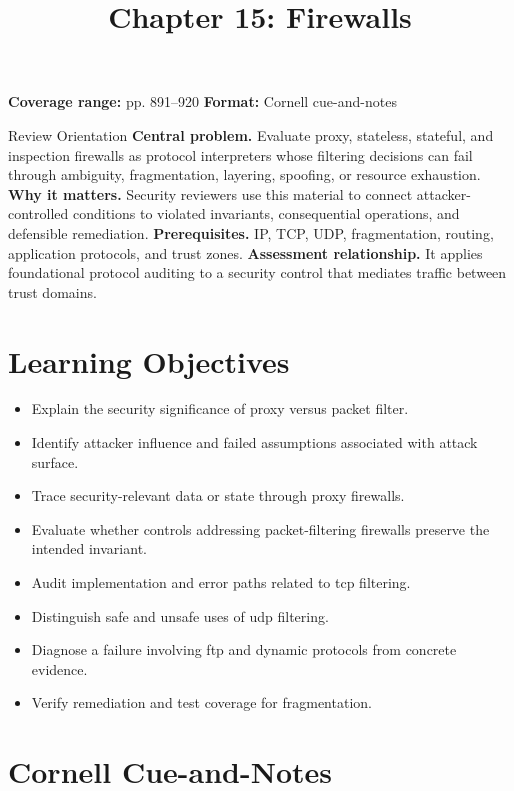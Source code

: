 \documentclass[11pt,letterpaper]{article}
\title{Chapter 15: Firewalls}
\author{}
\date{}
\begin{document}
\maketitle

\begin{center}
\small\color{Meta}\textbf{Coverage range:} pp. 891--920 \quad\textbullet\quad \textbf{Format:} Cornell cue-and-notes
\end{center}
\vspace{0.25em}
\begin{CornellOverviewBox}{Review Orientation}
\textbf{Central problem.} Evaluate proxy, stateless, stateful, and inspection firewalls as protocol interpreters whose filtering decisions can fail through ambiguity, fragmentation, layering, spoofing, or resource exhaustion.
\textbf{Why it matters.} Security reviewers use this material to connect attacker-controlled conditions to violated invariants, consequential operations, and defensible remediation.
\textbf{Prerequisites.} IP, TCP, UDP, fragmentation, routing, application protocols, and trust zones.
\textbf{Assessment relationship.} It applies foundational protocol auditing to a security control that mediates traffic between trust domains.
\end{CornellOverviewBox}
\section{Learning Objectives}
\begin{itemize}
\item Explain the security significance of proxy versus packet filter.
\item Identify attacker influence and failed assumptions associated with attack surface.
\item Trace security-relevant data or state through proxy firewalls.
\item Evaluate whether controls addressing packet-filtering firewalls preserve the intended invariant.
\item Audit implementation and error paths related to tcp filtering.
\item Distinguish safe and unsafe uses of udp filtering.
\item Diagnose a failure involving ftp and dynamic protocols from concrete evidence.
\item Verify remediation and test coverage for fragmentation.
\end{itemize}
\section{Cornell Cue-and-Notes}
\end{document}
